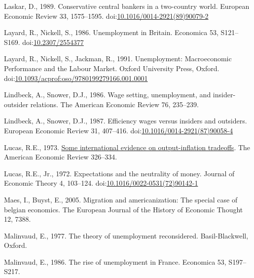\documentclass[]{elsarticle} %
\newlength{\cslhangindent}
\newlength{\cslentryspacingunit} %
\newenvironment{CSLReferences}[2] %
 {%
  \setlength{\parindent}{0pt}
  \ifodd #1
  \let\oldpar\par
  \def\par{\hangindent=\cslhangindent\oldpar}
  \fi
  \setlength{\parskip}{#2\cslentryspacingunit}
 }%
 {}
\begin{document}
\begin{CSLReferences}{1}{0}
\leavevmode{}%
Laskar, D., 1989. Conservative central bankers in a two-country world.
European Economic Review 33, 1575--1595.
doi:\href{https://doi.org/10.1016/0014-2921(89)90079-2}{10.1016/0014-2921(89)90079-2}

\leavevmode{}%
Layard, R., Nickell, S., 1986. Unemployment in {Britain}. Economica 53,
S121--S169. doi:\href{https://doi.org/10.2307/2554377}{10.2307/2554377}

\leavevmode{}%
Layard, R., Nickell, S., Jackman, R., 1991. Unemployment: {Macroeconomic
Performance} and the {Labour Market}. {Oxford University Press},
{Oxford}.
doi:\href{https://doi.org/10.1093/acprof:oso/9780199279166.001.0001}{10.1093/acprof:oso/9780199279166.001.0001}

\leavevmode{}%
Lindbeck, A., Snower, D.J., 1986. Wage setting, unemployment, and
insider-outsider relations. The American Economic Review 76, 235--239.

\leavevmode{}%
Lindbeck, A., Snower, D.J., 1987. Efficiency wages versus insiders and
outsiders. European Economic Review 31, 407--416.
doi:\href{https://doi.org/10.1016/0014-2921(87)90058-4}{10.1016/0014-2921(87)90058-4}

\leavevmode{}%
Lucas, R.E., 1973. \href{http://www.jstor.org/stable/1914364}{Some
international evidence on output-inflation tradeoffs}. The American
Economic Review 326--334.

\leavevmode{}%
Lucas, R.E., Jr., 1972. Expectations and the neutrality of money.
Journal of Economic Theory 4, 103--124.
doi:\href{https://doi.org/10.1016/0022-0531(72)90142-1}{10.1016/0022-0531(72)90142-1}

\leavevmode{}%
Maes, I., Buyst, E., 2005. Migration and americanization: The special
case of belgian economics. The European Journal of the History of
Economic Thought 12, 7388.

\leavevmode{}%
Malinvaud, E., 1977. The theory of unemployment reconsidered.
{Basil-Blackwell}, {Oxford}.

\leavevmode{}%
Malinvaud, E., 1986. The rise of unemployment in {France}. Economica 53,
S197--S217.


\end{CSLReferences}
\end{document}
